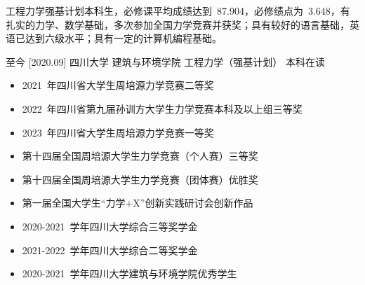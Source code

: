 \documentclass[zh]{resume}
\begin{document}
\universitylogo

\begin{paracol}{2}

\makeheader


\switchcolumn

\Name
工程力学强基计划本科生，必修课平均成绩达到~87.904，必修绩点为~3.648，有扎实的力学、数学基础，多次参加全国力学竞赛并获奖；具有较好的语言基础，英语已达到六级水平；具有一定的计算机编程基础。

\begin{competences}
\end{competences}

\begin{educations}
  \education%
    {至今}%
    [2020.09]%
    {四川大学}%
    {建筑与环境学院}%
    {工程力学（强基计划）}%
    {本科在读}
\end{educations}


\begin{itemize}
  \item 2021~年四川省大学生周培源力学竞赛二等奖
  \item 2022~年四川省第九届孙训方大学生力学竞赛本科及以上组三等奖
  \item 2023~年四川省大学生周培源力学竞赛一等奖
  \item 第十四届全国周培源大学生力学竞赛（个人赛）三等奖
  \item 第十四届全国周培源大学生力学竞赛（团体赛）优胜奖
  \item 第一届全国大学生“力学+X”创新实践研讨会创新作品
  \item 2020-2021~学年四川大学综合三等奖学金
  \item 2021-2022~学年四川大学综合二等奖学金
  \item 2020-2021~学年四川大学建筑与环境学院优秀学生
\end{itemize}


\end{paracol}
\end{document}
